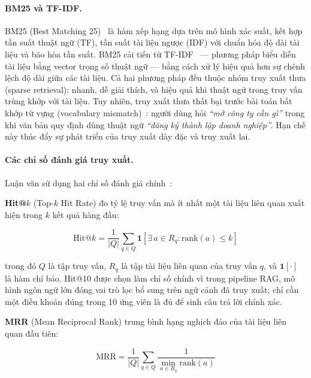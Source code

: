 \paragraph{BM25 và TF-IDF.}
\label{subsec:bm25}
BM25 (Best Matching 25)~\cite{robertson2009bm25} là hàm xếp hạng dựa trên mô hình
xác suất, kết hợp tần suất thuật ngữ (TF), tần suất tài liệu ngược (IDF) với chuẩn
hóa độ dài tài liệu và bão hòa tần suất. BM25 cải tiến từ TF-IDF~\cite{manning2008ir}
--- phương pháp biểu diễn tài liệu bằng vector trọng số thuật ngữ --- bằng cách xử lý
hiệu quả hơn sự chênh lệch độ dài giữa các tài liệu. Cả hai phương pháp đều thuộc
nhóm truy xuất thưa (sparse retrieval): nhanh, dễ giải thích, và hiệu quả khi thuật
ngữ trong truy vấn trùng khớp với tài liệu. Tuy nhiên, truy xuất thưa thất bại trước
bài toán bất khớp từ vựng (vocabulary mismatch)~\cite{reimers2019sbert}: người dùng
hỏi \textit{``mở công ty cần gì''} trong khi văn bản quy định dùng thuật ngữ
\textit{``đăng ký thành lập doanh nghiệp''}. Hạn chế này thúc đẩy sự phát triển
của truy xuất dày đặc và truy xuất lai.

\paragraph{Các chỉ số đánh giá truy xuất.}
\label{subsec:chi-so-danh-gia}
Luận văn sử dụng hai chỉ số đánh giá chính~\cite{manning2008ir}:

\textbf{Hit@$k$} (Top-$k$ Hit Rate) đo tỷ lệ truy vấn mà ít nhất một tài liệu
liên quan xuất hiện trong $k$ kết quả hàng đầu:

\begin{equation}
  \text{Hit@}k = \frac{1}{|Q|} \sum_{q \in Q}
  \mathbf{1}\!\left[\exists\, a \in R_q : \text{rank}(a) \leq k\right]
  \label{eq:hitk-def}
\end{equation}

\noindent trong đó $Q$ là tập truy vấn, $R_q$ là tập tài liệu liên quan của truy
vấn $q$, và $\mathbf{1}[\cdot]$ là hàm chỉ báo. Hit@10 được chọn làm chỉ số chính
vì trong pipeline RAG, mô hình ngôn ngữ lớn đóng vai trò lọc bổ sung trên ngữ cảnh
đã truy xuất; chỉ cần một điều khoản đúng trong 10 ứng viên là đủ để sinh câu trả
lời chính xác.

\textbf{MRR} (Mean Reciprocal Rank) trung bình hạng nghịch đảo của tài liệu liên
quan đầu tiên:

\begin{equation}
  \text{MRR} = \frac{1}{|Q|} \sum_{q \in Q}
  \frac{1}{\min_{a \in R_q} \text{rank}(a)}
  \label{eq:mrr-def}
\end{equation}

